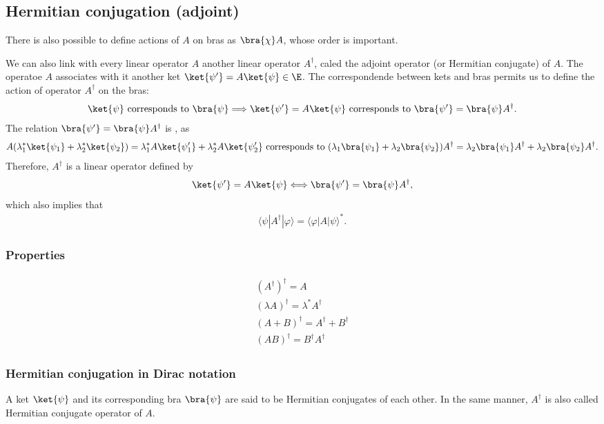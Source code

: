 \subsection{Hermitian conjugation (adjoint)}
There is also possible to define actions of $A$ on bras as $\bra{\chi}A$, whose order is important.

We can also link with every linear operator $A$ another linear operator $A^\dagger$, caled the adjoint operator (or Hermitian conjugate) of $A$.
The operatoe $A$ associates with it another ket $\ket{\psi'}=A\ket{\psi}\in\E$. The correspondende between kets and bras permits us to define the action of 
operator $A^\dagger$ on the bras: 
\begin{align}
    \ket{\psi}\text{ corresponds to }\bra{\psi}\Longrightarrow\ket{\psi'}=A\ket{\psi}\text{ corresponds to }\bra{\psi'}=\bra{\psi}A^\dagger.
\end{align}
The relation $\bra{\psi'}=\bra{\psi}A^\dagger$ is , as 
\begin{align*}
    A(\lambda^*_1\ket{\psi_1}+\lambda_2^*\ket{\psi_2})=\lambda_1^*A\ket{\psi_1'}+\lambda_2^*A\ket{\psi'_2}\text{ corresponds to }(\lambda_1\bra{\psi_1}+\lambda_2\bra{\psi_2})A^\dagger=\lambda_2\bra{\psi_1}A^\dagger+\lambda_2\bra{\psi_2}A^\dagger.
\end{align*} 
Therefore, $A^\dagger$ is a linear operator defined by 
\begin{align}
    \ket{\psi'}=A\ket{\psi}\Longleftrightarrow\bra{\psi'}=\bra{\psi}A^\dagger,
\end{align}
which also implies that 
\begin{align}
    \langle\psi|A^\dagger|\varphi\rangle=\langle\varphi|A|\psi\rangle^*.
\end{align}
\subsubsection{Properties}
\begin{align*}
    \begin{array}{l}
        (A^\dagger)^\dagger=A\\
        (\lambda A)^\dagger=\lambda^*A^\dagger\\
        (A+B)^\dagger=A^\dagger+B^\dagger\\
        (AB)^\dagger=B^\dagger A^\dagger
    \end{array}
\end{align*}
\subsubsection{Hermitian conjugation in Dirac notation}
A ket $\ket{\psi}$ and its corresponding bra $\bra{\psi}$ are said to be Hermitian conjugates of each other. In the same manner, $A^\dagger$ is 
also called Hermitian conjugate operator of $A$.

